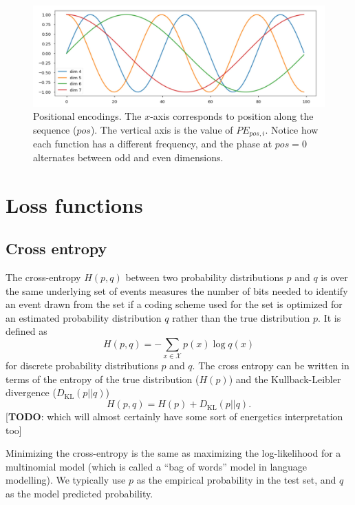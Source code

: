 \documentclass[11pt]{article}
\numberwithin{equation}{section}
\begin{document}
\begin{figure}
\begin{center}
\includegraphics[width=0.7\columnwidth]{../figures/pos_enc.jpg}  
\end{center}
\caption{Positional encodings. The $x$-axis corresponds to position along the sequence ($pos$). The vertical axis is the value of $PE_{pos, i}$. Notice how each function has a different frequency, and the phase at $pos=0$ alternates between odd and even dimensions.}
\label{fig:pos_enc}
\end{figure}


\section{Loss functions}

\subsection{Cross entropy}
The cross-entropy $H(p,q)$ between two probability distributions $p$ and $q$ is over the same underlying set of events measures the number of bits needed to identify an event drawn from the set if a coding scheme used for the set is optimized for an estimated probability distribution $q$ rather than the true distribution $p$. It is defined as 
\begin{equation}
H(p,q) = - \sum_{x \in \mathcal{X}} p(x) \log q(x)
\end{equation}
for discrete probability distributions $p$ and $q$. The cross entropy can be written in terms of the entropy of the true distribution ($H(p)$) and the Kullback-Leibler divergence ($D_{\text{KL}}(p||q)$)
\begin{equation}
H(p,q) = H(p) + D_{\text{KL}}(p||q).
\end{equation}
[\textbf{TODO}: which will almost certainly have some sort of energetics interpretation too] 

Minimizing the cross-entropy is the same as maximizing the log-likelihood for a multinomial model (which is called a ``bag of words'' model in language modelling). We typically use $p$ as the empirical probability in the test set, and $q$ as the model predicted probability.
\end{document}
